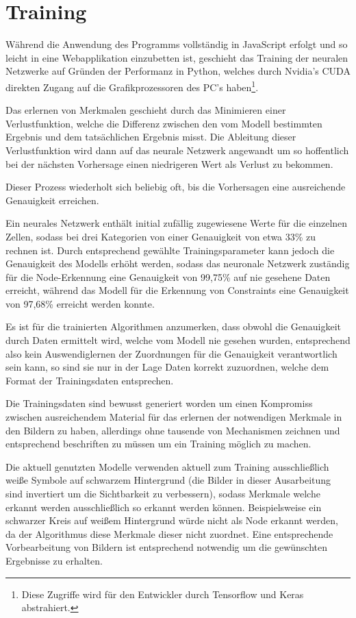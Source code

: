 \section{Training}
Während die Anwendung des Programms vollständig in JavaScript erfolgt und so leicht in eine Webapplikation einzubetten ist, geschieht das Training der neuralen Netzwerke auf Gründen der Performanz in Python, welches durch Nvidia's CUDA\cite{nvidia2019} direkten Zugang auf die Grafikprozessoren des PC's haben\footnote{Diese Zugriffe wird für den Entwickler durch Tensorflow und Keras abstrahiert.}.

Das erlernen von Merkmalen geschieht durch das Minimieren einer Verlustfunktion, welche die Differenz zwischen den vom Modell bestimmten Ergebnis und dem tatsächlichen Ergebnis misst.
Die Ableitung dieser Verlustfunktion wird dann auf das neurale Netzwerk angewandt um so hoffentlich bei der nächsten Vorhersage einen niedrigeren Wert als Verlust zu bekommen.

Dieser Prozess wiederholt sich beliebig oft, bis die Vorhersagen eine ausreichende Genauigkeit erreichen.

Ein neurales Netzwerk enthält initial zufällig zugewiesene Werte für die einzelnen Zellen, sodass bei drei Kategorien von einer Genauigkeit von etwa 33\% zu rechnen ist.
Durch entsprechend gewählte Trainingsparameter kann jedoch die Genauigkeit des Modells erhöht werden, sodass das neuronale Netzwerk zuständig für die Node-Erkennung eine Genauigkeit von 99,75\% auf nie gesehene Daten erreicht, während das Modell für die Erkennung von Constraints eine Genauigkeit von 97,68\% erreicht werden konnte.

Es ist für die trainierten Algorithmen anzumerken, dass obwohl die Genauigkeit durch Daten ermittelt wird, welche vom Modell nie gesehen wurden, entsprechend also kein Auswendiglernen der Zuordnungen\cite[p.705]{StuartRussell2018} für die Genauigkeit verantwortlich sein kann, so sind sie nur in der Lage Daten korrekt zuzuordnen, welche dem Format der Trainingsdaten entsprechen.

Die Trainingsdaten sind bewusst generiert worden um einen Kompromiss zwischen ausreichendem Material für das erlernen der notwendigen Merkmale in den Bildern zu haben, allerdings ohne tausende von Mechanismen zeichnen und entsprechend beschriften zu müssen um ein Training möglich zu machen.

Die aktuell genutzten Modelle verwenden aktuell zum Training ausschließlich weiße Symbole auf schwarzem Hintergrund (die Bilder in dieser Ausarbeitung sind invertiert um die Sichtbarkeit zu verbessern), sodass Merkmale welche erkannt werden ausschließlich so erkannt werden können. Beispielsweise ein schwarzer Kreis auf weißem Hintergrund würde nicht als Node erkannt werden, da der Algorithmus diese Merkmale dieser nicht zuordnet.
Eine entsprechende Vorbearbeitung von Bildern ist entsprechend notwendig um die gewünschten Ergebnisse zu erhalten.
